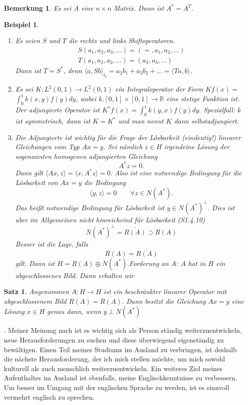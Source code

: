 \documentclass[12pt,titlepage]{article}
\newtheorem{bsp}[zahl]{Beispiel}
\newtheorem{bemerkung}[zahl]{Bemerkung}
\newtheorem{satz}[zahl]{Satz}
\numberwithin{equation}{section}
\begin{document}
\begin{bemerkung}
Es sei $A$ eine $n \times n $ Matrix. Dann ist $A^*=A^T.$
\end{bemerkung}
\begin{bsp}
\begin{enumerate}
\item Es seien $S$ und $T$ die rechts und links Shiftoperatoren.
\begin{align*}
S(a_1,a_2,a_3,\ldots)=(=,a_1,a_2,\ldots)\\
T(a_1,a_2,a_3,\ldots)=(a_2,a_3,\ldots)
\end{align*}
Dann ist $T=S^*$, denn $\langle a, Sb \rangle_{l_2}=a_2b_1+a_3b_2+\ldots=\langle Ta,b\rangle$.
\item Es sei $K:L^2(0,1) \to L^2(0,1)$ ein Integraloperator der Form $Kf(x)=$ \\$ \int_0^1k(x,y)f(y)dy$, wobei $k.[0,1]\times [0,1]\to \mathbb{R}$ eine stetige Funktion ist. Der adjungierte Operator ist $K^*f(x)=\int_0^1k(y,x)f(y)dy.$ Spezialfall: $k$ ist symmetrisch, dann ist $K=K^*$ und man nennt $K$ dann selbstadjungiert.
\item Die Adjungierte ist wichtig für die Frage der Lösbarkeit (eindeutig!) linearer Gleichungen vom Typ $Ax=y$. Sei nämlich $z\in H $ irgendeine Lösung der sogenannten homogenen adjungierten Gleichung 
\[
A^*z =0.
\]Dann gilt $\langle Ax,z\rangle =\langle x, A^*z \rangle=0.$ Also ist eine notwendige Bedingung für die Lösbarkeit von $Ax=y$ die Bedingung 
\[
\langle y,z\rangle =0\qquad \forall z \in N(A^*).
\] 
Das heißt notwendige Bedingung für Lösbarkeit ist $y \in N(A^*)^{\perp}.$ Dies ist aber im Allgemeinen nicht hinreicheind für Lösbarkeit (S1.4.10)
\[
N(A^*)^{\perp}=\overline{R(A)}\supset R(A)
\]Besser ist die Lage, falls 
\[
R(A)=\overline{R(A)}
\] gilt. Dann ist $H=R(A) \oplus N(A^*).$Forderung an $A$: $A$ hat in $H$ ein abgeschlossenes Bild. Dann erhalten wir
\end{enumerate}
\end{bsp}
\begin{satz}
Angenommen $A:H \to H$ ist ein beschränkter linearer Operator mit abgeschlossenem Bild $R(A)= \overline{R(A)}.$ Dann besitzt die Gleichung $Ax=y$ eine Lösung $x \in H$ genau dann, wenn $y \perp N(A^*)$
\end{satz}
. Meiner Meinung nach ist es wichtig sich als Person ständig weiterzuentwickeln, neue Herausforderungen zu suchen und diese überwiegend eigenständig zu bewältigen. Einen Teil meines Studiums im Ausland zu verbringen, ist deshalb die nächste Herausforderung, der ich mich stellen möchte, um mich sowohl kulturell als auch menschlich weiterzuentwickeln. 
Ein weiteres Ziel meines Aufenthaltes im Ausland ist ebenfalls, meine Englischkenntnisse zu verbessern.  Um besser im Umgang mit der englischen Sprache zu werden, ist es sinnvoll vermehrt englisch zu sprechen. 
%
\end{document}
